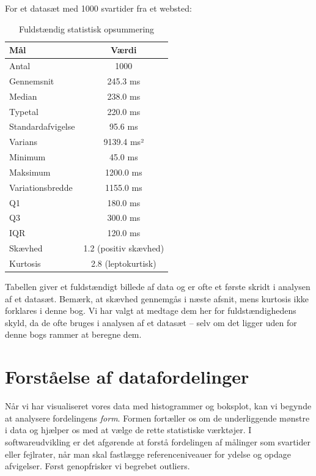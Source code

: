 \begin{example}

For et datasæt med 1000 svartider fra et websted:

\begin{table}[htbp]
\centering
\renewcommand{\arraystretch}{1.3}
\begin{tabular}{|l|c|}
\hline
\textbf{Mål} & \textbf{Værdi} \\
\hline
Antal & 1000 \\
Gennemsnit & 245.3 ms \\
Median & 238.0 ms \\
Typetal & 220.0 ms \\
Standardafvigelse & 95.6 ms \\
Varians & 9139.4 ms² \\
Minimum & 45.0 ms \\
Maksimum & 1200.0 ms \\
Variationsbredde & 1155.0 ms \\
Q1 & 180.0 ms \\
Q3 & 300.0 ms \\
IQR & 120.0 ms \\
Skævhed & 1.2 (positiv skævhed) \\
Kurtosis & 2.8 (leptokurtisk) \\
\hline
\end{tabular}
\caption{Fuldstændig statistisk opsummering}
\label{tab:summary_stats}
\end{table}
\end{example}

Tabellen giver et fuldstændigt billede af data og er ofte et første skridt i analysen af et datasæt. Bemærk, at skævhed gennemgås i næste afsnit, mens kurtosis ikke forklares i denne bog. Vi har valgt at medtage dem her for fuldstændighedens skyld, da de ofte bruges i analysen af et datasæt -- selv om det ligger uden for denne bogs rammer at beregne dem.


\section{Forståelse af datafordelinger} \label{sec:data_distributions}
Når vi har visualiseret vores data med histogrammer og boksplot, kan vi begynde at analysere fordelingens \textit{form}. Formen fortæller os om de underliggende mønstre i data og hjælper os med at vælge de rette statistiske værktøjer. I softwareudvikling er det afgørende at forstå fordelingen af målinger som svartider eller fejlrater, når man skal fastlægge referenceniveauer for ydelse og opdage afvigelser. Først genopfrisker vi begrebet outliers.

